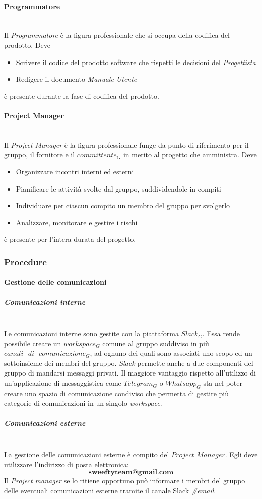 		\paragraph{Programmatore} \mbox{} \\
		Il \emph{Programmatore} è la figura professionale che si occupa della codifica del prodotto. Deve
		\begin{itemize}
			\item Scrivere il codice  del prodotto software che rispetti le decisioni del \emph{Progettista}
			\item Redigere il documento \emph{Manuale Utente}
		\end{itemize}
		è presente durante la fase di codifica del prodotto.
		\paragraph{Project Manager} \mbox{} \\
		Il \emph{Project Manager} è la figura professionale funge da punto di riferimento per il gruppo, il fornitore e il $committente_G$ in merito al progetto che amministra. Deve
		\begin{itemize}
			\item Organizzare incontri interni ed esterni
			\item Pianificare le attività svolte dal gruppo, suddividendole in compiti
			\item Individuare per ciascun compito un membro del gruppo per svolgerlo
			\item Analizzare, monitorare e gestire i rischi
		\end{itemize}
		è presente per l'intera durata del progetto.
	\subsubsection{Procedure}
		\paragraph{Gestione delle comunicazioni}
			\subparagraph{Comunicazioni interne} \mbox{} \\
			\label{comInterne}
			Le comunicazioni interne sono gestite con la piattaforma $Slack_G$. Essa rende possibile creare un $workspace_G$ comune al gruppo suddiviso in più $canali \text{ } di \text{ } comunicazione_G$, ad ognuno dei quali sono associati uno scopo ed un sottoinsieme dei membri del gruppo. \emph{Slack} permette anche a due componenti del gruppo di mandarsi messaggi privati. Il maggiore vantaggio rispetto all'utilizzo di un'applicazione di messaggistica come $Telegram_G$ o $Whatsapp_G$ sta nel poter creare uno spazio di comunicazione condiviso che permetta di gestire più categorie di comunicazioni in un singolo \emph{workspace}. %
			\subparagraph{Comunicazioni esterne} \mbox{} \\
			 La gestione delle comunicazioni esterne è compito del $Project$ $Manager$. Egli deve utilizzare l'indirizzo di posta elettronica:
			$$\textbf{sweeftyteam@gmail.com}$$
			Il \emph{Project manager} se lo ritiene opportuno può informare i membri del gruppo delle eventuali comunicazioni esterne tramite il canale Slack \emph{\#email}.
			
